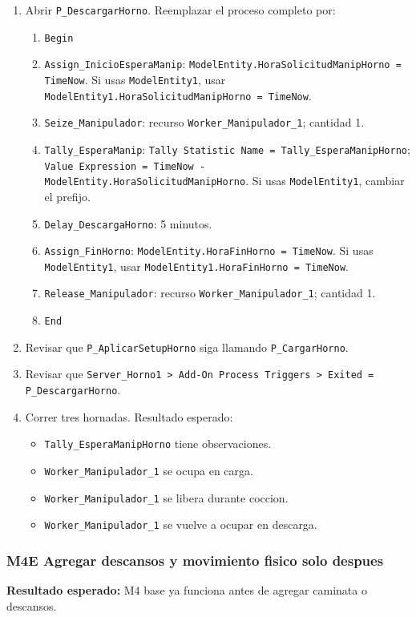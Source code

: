 \documentclass[11pt]{article}
\newcommand{\simio}[1]{\texttt{#1}}
\newcommand{\state}[1]{\texttt{#1}}
\newcommand{\proc}[1]{\texttt{#1}}
\begin{document}
\begin{enumerate}
\begin{enumerate}
    \item \simio{End}
  \end{enumerate}
  \item Abrir \proc{P\_DescargarHorno}. Reemplazar el proceso completo por:
  \begin{enumerate}
    \item \simio{Begin}
    \item \simio{Assign\_InicioEsperaManip}: \state{ModelEntity.HoraSolicitudManipHorno = TimeNow}. Si usas \simio{ModelEntity1}, usar \state{ModelEntity1.HoraSolicitudManipHorno = TimeNow}.
    \item \simio{Seize\_Manipulador}: recurso \simio{Worker\_Manipulador\_1}; cantidad 1.
    \item \simio{Tally\_EsperaManip}: \simio{Tally Statistic Name = Tally\_EsperaManipHorno}; \simio{Value Expression = TimeNow - ModelEntity.HoraSolicitudManipHorno}. Si usas \simio{ModelEntity1}, cambiar el prefijo.
    \item \simio{Delay\_DescargaHorno}: 5 minutos.
    \item \simio{Assign\_FinHorno}: \state{ModelEntity.HoraFinHorno = TimeNow}. Si usas \simio{ModelEntity1}, usar \state{ModelEntity1.HoraFinHorno = TimeNow}.
    \item \simio{Release\_Manipulador}: recurso \simio{Worker\_Manipulador\_1}; cantidad 1.
    \item \simio{End}
  \end{enumerate}
  \item Revisar que \proc{P\_AplicarSetupHorno} siga llamando \proc{P\_CargarHorno}.
  \item Revisar que \simio{Server\_Horno1 > Add-On Process Triggers > Exited = P\_DescargarHorno}.
  \item Correr tres hornadas. Resultado esperado:
  \begin{itemize}
    \item \simio{Tally\_EsperaManipHorno} tiene observaciones.
    \item \simio{Worker\_Manipulador\_1} se ocupa en carga.
    \item \simio{Worker\_Manipulador\_1} se libera durante coccion.
    \item \simio{Worker\_Manipulador\_1} se vuelve a ocupar en descarga.
  \end{itemize}
\end{enumerate}

\subsubsection{M4E Agregar descansos y movimiento fisico solo despues}
\textbf{Resultado esperado:} M4 base ya funciona antes de agregar caminata o descansos.
\end{document}
